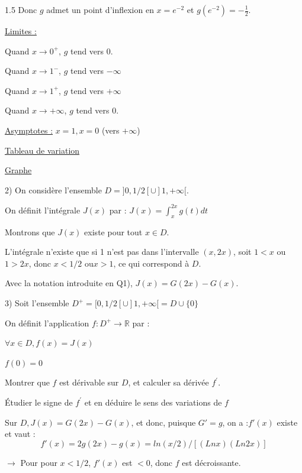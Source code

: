 \documentclass[12pt]{article}
\begin{document}
\begin{spacing}{1.5}
Donc $g$ admet un point d'inflexion en $x = e^{-2}$ et $g(e^{-2}) =-\frac{1}{2}$. 

\underline{Limites :}
 
Quand $x\rightarrow 0^+$, $g$ tend vers 0. 

Quand $x\rightarrow 1^-$, $g$ tend vers $-\infty$
 
Quand $x\rightarrow 1^+$, $g$ tend vers $+\infty$
 
Quand $x\rightarrow +\infty$, $g$ tend vers 0.
 
\underline{Asymptotes :} $x = 1, x = 0$ (vers $+\infty$)

\underline{Tableau de variation} 

\begin{center}
\end{center}


\underline{Graphe}

\quad

2) On considère l'ensemble $D = ]0,1/2[\cup]1,+\infty[$.

On définit l'intégrale $J(x)$ par : 
$J(x) =\int_{x}^{2x}g(t)dt$

Montrons que $J(x)$ existe pour tout $x\in D$.

 L'intégrale n'existe que si 1 n'est pas dans l'intervalle $(x, 2x)$, soit $1 < x$ ou $1 > 2x$, 
donc $x <1/2$ ou$ x > 1$, ce qui correspond à $D$. 

Avec la notation introduite en Q1), $J(x) = G(2x)-G(x)$. 

3) Soit l'ensemble $D^+ = [0,1/2[\cup ]1,+\infty[ = D \cup \lbrace 0\rbrace$

On définit l'application $f : D^+\longrightarrow \mathbb{R}$ par : 

$\forall x \in D,f(x) = J(x)$

$f(0)=0$

Montrer que $f$ est dérivable sur $D$, et calculer sa dérivée $f^{\prime}$.

Étudier le signe de $f^{\prime}$ et en déduire le sens des variations de $f$ 

Sur $D, J(x)= G(2x)-G(x)$, et donc, puisque $G'= g$, on a :$f'(x)$ existe et vaut : 
\[
f'(x) = 2g(2x)-g(x) = ln(x/2) /[(Lnx)(Ln2x)]\]

$\longrightarrow$ Pour pour $x < 1/2$, $f'(x)$ est $<0$, donc $f$ est décroissante. 


\end{spacing}
\end{document}
